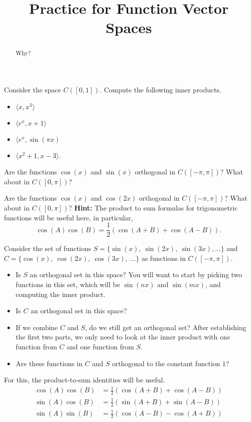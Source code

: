 \documentclass{ximera}
\title{Practice for Function Vector Spaces}
\begin{document}
\begin{abstract}
Why?
\end{abstract}
\maketitle



\begin{exercise}
    Consider the space $C([0,1])$. Compute the following inner products. 
    \begin{itemize}
        \item $\langle x, x^3 \rangle$
        \item $\langle e^x, x+1 \rangle$
        \item $\langle e^x, \sin(\pi x)$
        \item $\langle x^2 + 1, x - 3 \rangle$. 
    \end{itemize}
\end{exercise}

\begin{exercise}
    Are the functions $\cos(x)$ and $\sin(x)$ orthogonal in $C([-\pi, \pi])$? What about in $C([0,\pi])$?
\end{exercise}

\begin{exercise}
    Are the functions $\cos(x)$ and $\cos(2x)$ orthogonal in $C([-\pi, \pi])$? What about in $C([0,\pi])$? \textbf{Hint:} The product to sum formulas for trigonometric functions will be useful here, in particular,
    \[ 
        \cos(A)\cos(B) = \frac{1}{2}\left(\cos(A+B) + \cos(A-B)\right). 
    \]
\end{exercise}

\begin{exercise}
    Consider the set of functions $S = \{\sin(x),\ \sin(2x),\ \sin(3x), ... \}$ and $C = \{\cos(x),\  \cos(2x),\ \cos(3x),\ ... \}$ as functions in $C([-\pi, \pi])$. 
    \begin{itemize}
        \item Is $S$ an orthogonal set in this space? You will want to start by picking two functions in this set, which will be $\sin(nx)$ and $\sin(mx)$, and computing the inner product.
        \item Is $C$ an orthogonal set in this space?
        \item If we combine $C$ and $S$, do we still get an orthogonal set? After establishing the first two parts, we only need to look at the inner product with one function from $C$ and one function from $S$. 
        \item Are these functions in $C$ and $S$ orthogonal to the constant function $1$?
    \end{itemize}
    For this, the product-to-sum identities will be useful. 
    \[ 
        \begin{split}
            \cos(A)\cos(B) &= \frac{1}{2}\left(\cos(A+B) + \cos(A-B)\right)\\
            \sin(A)\cos(B) &= \frac{1}{2}\left(\sin(A+B) + \sin(A-B)\right) \\
            \sin(A)\sin(B) &= \frac{1}{2}\left(\cos(A-B) - \cos(A+B)\right)
        \end{split}
     \]
\end{exercise}
\end{document}
